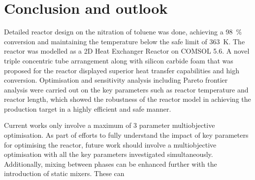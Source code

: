\section{Conclusion and outlook} \label{sec:conclusion}
Detailed reactor design on the nitration of toluene was done, achieving a \SI{98}{\%} conversion and maintaining the temperature below the safe limit of \SI{363}{\K}. The reactor was modelled as a 2D Heat Exchanger Reactor on COMSOL 5.6. A novel triple concentric tube arrangement along with silicon carbide foam that was proposed for the reactor displayed superior heat transfer capabilities and high conversion. Optimisation and sensitivity analysis including Pareto frontier analysis were carried out on the key parameters such as reactor temperature and reactor length, which showed the robustness of the reactor model in achieving the production target in a highly efficient and safe manner. 

Current works only involve a maximum of 3 parameter multiobjective optimisation. As part of efforts to fully understand the impact of key parameters for optimising the reactor, future work should involve a multiobjective optimisation with all the key parameters investigated simultaneously. Additionally, mixing between phases can be enhanced further with the introduction of static mixers. These can  


